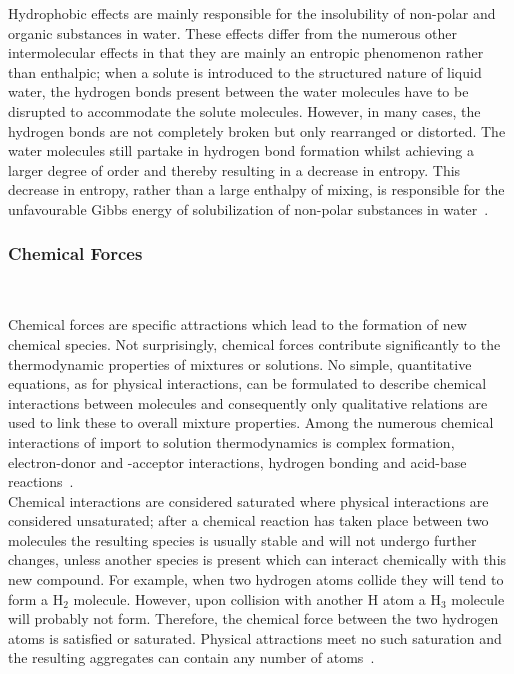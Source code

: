 Hydrophobic effects are mainly responsible for the insolubility of non-polar and organic substances in water. These effects differ from the numerous other intermolecular effects in that they are mainly an entropic phenomenon rather than enthalpic; when a solute is introduced to the structured nature of liquid water, the hydrogen bonds present between the water molecules have to be disrupted to accommodate the solute molecules. However, in many cases, the hydrogen bonds are not completely broken but only rearranged or distorted. The water molecules still partake in hydrogen bond formation whilst achieving a larger degree of order and thereby resulting in a decrease in entropy.  This decrease in entropy, rather than a large enthalpy of mixing, is responsible for the unfavourable Gibbs energy of solubilization of non-polar substances in water~\cite{MolecularThermodynamicsOfFluidPhaseEquilibria}.\\



\subsubsection{Chemical Forces}\

Chemical forces are specific attractions which lead to the formation of new chemical species. Not surprisingly, chemical forces contribute significantly to the thermodynamic properties of mixtures or solutions. No simple, quantitative equations, as for physical interactions, can be formulated to describe chemical interactions between molecules and consequently only qualitative relations are used to link these to overall mixture properties. Among the numerous chemical interactions of import to solution thermodynamics is complex formation, electron-donor and -acceptor interactions, hydrogen bonding and acid-base reactions~\cite{MolecularThermodynamicsOfFluidPhaseEquilibria}.\\

Chemical interactions are considered saturated where physical interactions are considered unsaturated; after a chemical reaction has taken place between two molecules the resulting species is usually stable and will not undergo further changes, unless another species is present which can interact chemically with this new compound. For example, when two hydrogen atoms collide they will tend to form a $\mathrm{H_{2}}$ molecule. However, upon collision with another $\mathrm{H}$ atom a $\mathrm{H_{3}}$ molecule will probably not form. Therefore, the chemical force between the two hydrogen atoms is satisfied or saturated. Physical attractions meet no such saturation and the resulting aggregates can contain any number of atoms~\cite{MolecularThermodynamicsOfFluidPhaseEquilibria}.\\

